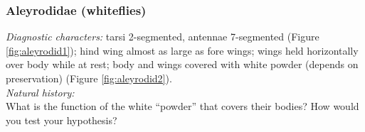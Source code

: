 \documentclass[letterpaper, 11pt]{article}
\begin{document}
\subsubsection{Aleyrodidae (whiteflies)}
\noindent{}\textit{Diagnostic characters:} tarsi 2-segmented, antennae 7-segmented (Figure \ref{fig:aleyrodid1}); hind wing almost as large as fore wings; wings held horizontally over body while at rest; body and wings covered with white powder (depends on preservation) (Figure \ref{fig:aleyrodid2}).\\

\noindent{}\textit{Natural history:} \\

\noindent{}What is the function of the white ``powder'' that covers their bodies? How would you test your hypothesis? \vspace{4cm}
\end{document}
